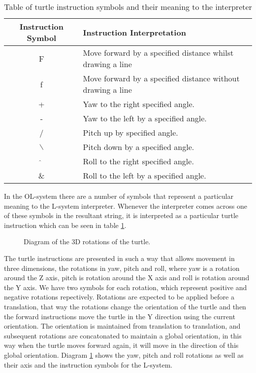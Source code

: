 \begin{flushleft}
\vspace{5mm}

\begin{table}[h!]
\begin{tabular}{ | c | l | }
\hline
	Instruction Symbol 	& Instruction Interpretation \\  
\hline
\hline
	F 					& Move forward by a specified distance whilst drawing a line\\
\hline
	f 					& Move forward by a specified distance without drawing a line\\
\hline
	+ 					& Yaw to the right specified angle.\\
\hline
	- 					& Yaw to the left by a specified angle.\\
\hline
	/ 					& Pitch up by specified angle. \\
\hline
	$\backslash$ 		& Pitch down by a specified angle.\\
\hline
	$\hat{}$ 			& Roll to the right specified angle.\\
\hline
	\& 					& Roll to the left by a specified angle.\\
\hline
\end{tabular}
\caption{Table of turtle instruction symbols and their meaning to the interpreter}
\label{instruction table 1}
\end{table}
\FloatBarrier

In the OL-system there are a number of symbols that represent a particular meaning to the L-system interpreter. Whenever the interpreter comes across one of these symbols in the resultant string, it is interpreted as a particular turtle instruction which can be seen in table \ref{instruction table 1}. 

\vspace{5mm}

\begin{figure}[htbp]
	{\centering
		\setlength{\fboxrule}{1pt}
		\vspace{7px}
		\caption{Diagram of the 3D rotations of the turtle.} \label{3D rotations}
	}
\end{figure}
\FloatBarrier

The turtle instructions are presented in such a way that allows movement in three dimensions, the rotations in yaw, pitch and roll, where yaw is a rotation around the Z axis, pitch is rotation around the X axis and roll is rotation around the Y axis. We have two symbols for each rotation, which represent positive and negative rotations repectively. Rotations are expected to be applied before a translation, that way the rotations change the orientation of the turtle and then the forward instructions move the turtle in the Y direction using the current orientation. The orientation is maintained from translation to translation, and subsequent rotations are concatonated to maintain a global orientation, in this way when the turtle moves forward again, it will move in the direction of this global orientation. Diagram  \ref{3D rotations} shows the yaw, pitch and roll rotations as well as their axis and the instruction symbols for the L-system. \\ 


\end{flushleft}

